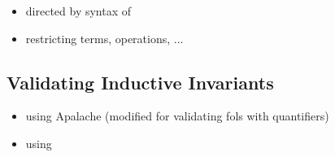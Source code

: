 \begin{itemize}
  \item directed by syntax of \tlaplus
  \item restricting terms, operations, $\ldots$
\end{itemize}
\subsection{Validating Inductive Invariants} \label{ss:validating}

\begin{itemize}
  \item using Apalache (modified for validating fols with quantifiers)
  \item using \cite{ProofAutomation:PhDThesis2014}
\end{itemize}
